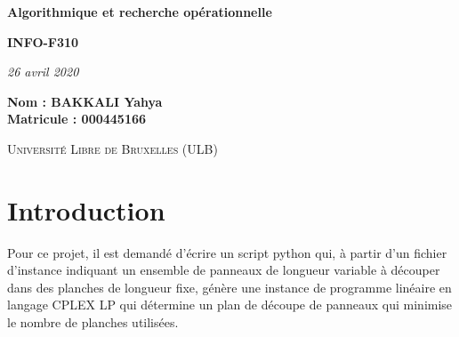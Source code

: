 \documentclass{article}[A4]
\begin{document}
\begin{titlepage}
    \begin{center}
        \vspace*{1cm}


        \Huge
        \textbf{Algorithmique et recherche opérationnelle}
        \vspace{0.25cm}

        \LARGE
        \textbf{INFO-F310}

        \vspace{0.25cm}
        \LARGE

        \vspace{0.25cm}
		\textit{26 avril 2020}

        \vspace{3cm}
       	\Large
        \textbf{Nom : BAKKALI Yahya \\}
        \textbf{Matricule : 000445166 \\}


        \vspace{2cm}

        \textsc{Université Libre de Bruxelles (ULB)}


    \end{center}
\end{titlepage}

\setcounter{tocdepth}{3}
\renewcommand{\contentsname}{Table des matières}
\tableofcontents
\newpage
\large

\section{Introduction}
Pour ce projet, il est demandé d'écrire un script python qui, à partir
d'un fichier d'instance indiquant un ensemble de panneaux de longueur
variable à découper dans des planches de longueur fixe, génère une 
instance de programme linéaire en langage CPLEX LP qui détermine un 
plan de découpe de panneaux qui minimise le nombre de planches 
utilisées.
\end{document}
